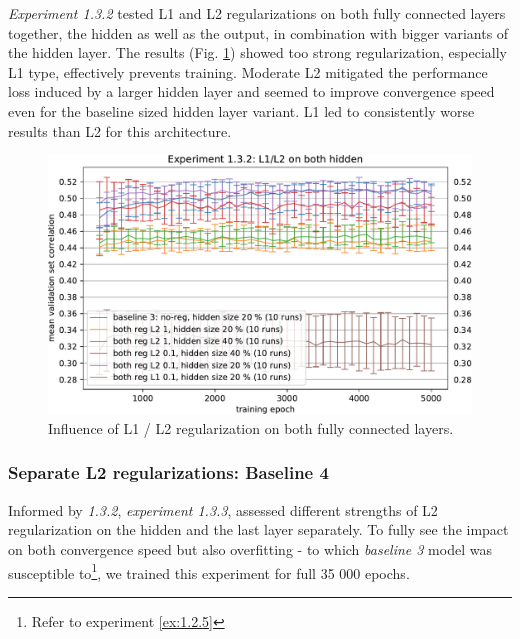 \textit{Experiment 1.3.2} tested L1 and L2 regularizations on both fully connected layers together, the hidden as well as the output, in combination with bigger variants of the hidden layer. The results (Fig. \ref{fig:5.1.3.2}) showed too strong regularization, especially L1 type, effectively prevents training. Moderate L2 mitigated the performance loss induced by a larger hidden layer and seemed to improve convergence speed even for the baseline sized hidden layer variant. L1 led to consistently worse results than L2 for this architecture.

\begin{figure}[H]
    \centering
    \includegraphics[width=1\textwidth]{../figures/05_1_3_2}
    \caption[Experiment 1.3.2]{Influence of L1 / L2 regularization on both fully connected layers.}
    \label{fig:5.1.3.2}
\end{figure}

\subsubsection{Separate L2 regularizations: Baseline 4}\label{ex:1.3.3}

Informed by \textit{1.3.2}, \textit{experiment 1.3.3}, assessed different strengths of L2 regularization on the hidden and the last layer separately. To fully see the impact on both convergence speed but also overfitting - to which \textit{baseline 3} model was susceptible to\footnote{Refer to experiment \ref{ex:1.2.5}}, we trained this experiment for full 35 000 epochs.

